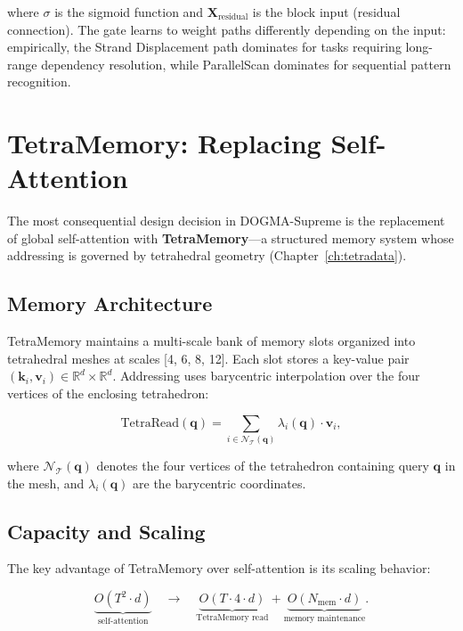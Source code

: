 where $\sigma$ is the sigmoid function and $\mathbf{X}_{\mathrm{residual}}$ is the block input (residual connection). The gate learns to weight paths differently depending on the input: empirically, the Strand Displacement path dominates for tasks requiring long-range dependency resolution, while ParallelScan dominates for sequential pattern recognition.

\section{TetraMemory: Replacing Self-Attention}
\label{sec:tetramemory}

The most consequential design decision in DOGMA-Supreme is the replacement of global self-attention with \textbf{TetraMemory}---a structured memory system whose addressing is governed by tetrahedral geometry (Chapter~\ref{ch:tetradata}).

\subsection{Memory Architecture}

TetraMemory maintains a multi-scale bank of memory slots organized into tetrahedral meshes at scales [4, 6, 8, 12]. Each slot stores a key-value pair $(\mathbf{k}_i, \mathbf{v}_i) \in \mathbb{R}^{d} \times \mathbb{R}^{d}$. Addressing uses barycentric interpolation over the four vertices of the enclosing tetrahedron:

\begin{equation}
\mathrm{TetraRead}(\mathbf{q}) = \sum_{i \in \mathcal{N}_{\mathcal{T}}(\mathbf{q})} \lambda_i(\mathbf{q}) \cdot \mathbf{v}_i,
\label{eq:tetra-read}
\end{equation}

where $\mathcal{N}_{\mathcal{T}}(\mathbf{q})$ denotes the four vertices of the tetrahedron containing query $\mathbf{q}$ in the mesh, and $\lambda_i(\mathbf{q})$ are the barycentric coordinates.

\subsection{Capacity and Scaling}

The key advantage of TetraMemory over self-attention is its scaling behavior:

\begin{equation}
\underbrace{O(T^2 \cdot d)}_{\text{self-attention}} \quad \longrightarrow \quad \underbrace{O(T \cdot 4 \cdot d)}_{\text{TetraMemory read}} + \underbrace{O(N_{\mathrm{mem}} \cdot d)}_{\text{memory maintenance}}.
\label{eq:scaling-comparison}
\end{equation}

